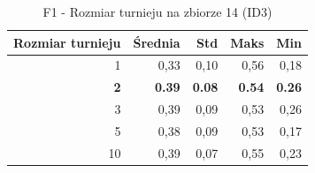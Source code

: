 \begin{table}[htbp]
\centering
\small
\setlength{\tabcolsep}{6pt}
\renewcommand{\arraystretch}{1.2}
\caption{F1 - Rozmiar turnieju na zbiorze 14 (ID3)}
\label{tab:ID3_tournament_size_14_f1}
\begin{tabular}{r|r|r|r|r}
\toprule
Rozmiar turnieju & Średnia & Std & Maks & Min \\
\hline
1 & 0,33 & 0,10 & 0,56 & 0,18 \\
\textbf{2} & \textbf{0.39} & \textbf{0.08} & \textbf{0.54} & \textbf{0.26} \\
3 & 0,39 & 0,09 & 0,53 & 0,26 \\
5 & 0,38 & 0,09 & 0,53 & 0,17 \\
10 & 0,39 & 0,07 & 0,55 & 0,23 \\
\bottomrule
\end{tabular}
\end{table}